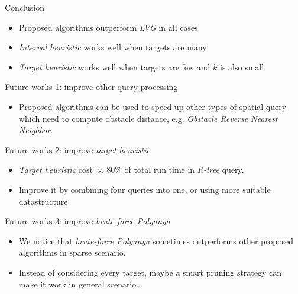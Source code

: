 \begin{frame}{Conclusion}
    \begin{itemize}
        \item Proposed algorithms outperform \textit{LVG} in all cases
        \item \textit{Interval heuristic} works well when targets are many
        \item \textit{Target heuristic} works well when targets are few and $k$ is also small
    \end{itemize}
\end{frame}

\begin{frame}{Future works 1: improve other query processing}
    \begin{itemize}
        \item \small{
            Proposed algorithms can be used to speed up other types of spatial query which need to compute obstacle distance, e.g. \textit{Obstacle Reverse Nearest Neighbor}.
        }
    \end{itemize}
\end{frame}

\begin{frame}{Future works 2: improve \textit{target heuristic}}
    \begin{itemize}
        \item \small {
          \textit{Target heuristic} cost $\approx 80\%$ of total run time in \textit{R-tree} query. 
        }
        \item \small {
            Improve it by combining four queries into one, or using more suitable datastructure.
        }
    \end{itemize}
\end{frame}

\begin{frame}{Future works 3: improve \textit{brute-force Polyanya}}
    \begin{itemize}
        \item \small {
            We notice that \textit{brute-force Polyanya} sometimes outperforms other proposed algorithms in sparse scenario.
        }
        \item \small {
            Instead of considering every target, maybe a smart pruning strategy can make it work in general scenario. 
        }
    \end{itemize}
\end{frame}
